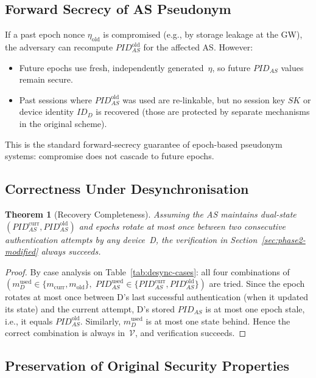 \documentclass[12pt,a4paper]{article}
\newtheorem{theorem}{Theorem}[section]
\newcommand{\IDd}{\mathit{ID}_D}
\newcommand{\PIDas}{\mathit{PID}_{AS}}
\newcommand{\PIDascurr}{\mathit{PID}_{AS}^{\mathrm{curr}}}
\newcommand{\PIDASOld}{\mathit{PID}_{AS}^{\mathrm{old}}}
\newcommand{\mcurr}{m_{\mathrm{curr}}}
\newcommand{\mold}{m_{\mathrm{old}}}
\newcommand{\SK}{\mathit{SK}}
\newcommand{\etaold}{\eta_{\mathrm{old}}}
\begin{document}
\subsection{Forward Secrecy of AS Pseudonym}

If a past epoch nonce $\etaold$ is compromised (e.g., by storage
leakage at the GW), the adversary can recompute $\PIDASOld$ for the
affected AS.  However:
\begin{itemize}
  \item Future epochs use fresh, independently generated~$\eta$,
        so future $\PIDas$ values remain secure.
  \item Past sessions where $\PIDASOld$ was used are re-linkable, but
        no session key $\SK$ or device identity $\IDd$ is recovered
        (those are protected by separate mechanisms in the original
        scheme).
\end{itemize}
This is the standard forward-secrecy guarantee of epoch-based
pseudonym systems: compromise does not cascade to future epochs.

\subsection{Correctness Under Desynchronisation}

\begin{theorem}[Recovery Completeness]
\label{thm:desync}
Assuming the AS maintains dual-state $(\PIDascurr, \PIDASOld)$ and
epochs rotate at most once between two consecutive authentication
attempts by any device~D, the verification in
Section~\ref{sec:phase2-modified} always succeeds.
\end{theorem}

\begin{proof}
By case analysis on Table~\ref{tab:desync-cases}: all four combinations
of $(m_D^{\mathrm{used}} \in \{\mcurr, \mold\},\;
\PIDas^{\mathrm{used}} \in \{\PIDascurr, \PIDASOld\})$ are tried.
Since the epoch rotates at most once between D's last successful
authentication (when it updated its state) and the current attempt,
D's stored $\PIDas$ is at most one epoch stale, i.e., it equals
$\PIDASOld$.  Similarly, $m_D^{\mathrm{used}}$ is at most one
state behind.  Hence the correct combination is always in~$\mathcal{V}$,
and verification succeeds.
\end{proof}

\subsection{Preservation of Original Security Properties}
\end{document}
